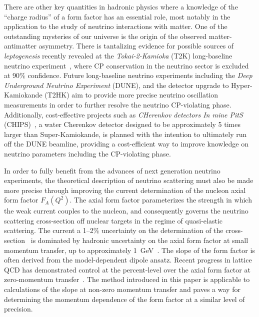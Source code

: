 \documentclass[prd,aps,twocolumn,superscriptaddress,tightenlines,nofootinbib,floatfix,preprintnumbers,10pt]{revtex4-1}
\begin{document}
There are other key quantities in hadronic physics where a knowledge
of the ``charge radius'' of a form factor has an essential role, most
notably in the application to the study of neutrino interactions with
matter.  One of the outstanding mysteries of our universe is the
origin of the observed matter-antimatter asymmetry.  There is
tantalizing evidence for possible sources of \textit{leptogenesis}
recently revealed at the \textit{Tokai-2-Kamioka} (T2K) long-baseline
neutrino experiment~\cite{Abe:2017uxa}, where CP conservation in the
neutrino sector is excluded at 90\% confidence.  Future long-baseline
neutrino experiments including the \textit{Deep Underground Neutrino
  Experiment} (DUNE), and the detector upgrade to Hyper-Kamiokande
(T2HK) aim to provide more precise neutrino oscillation measurements
in order to further resolve the neutrino CP-violating phase.
Additionally, cost-effective projects such as \textit{CHerenkov
  detectors In mine PitS} (CHIPS)~\cite{Adamson:2013xka}, a water
Cherenkov detector designed to be approximately 5 times larger than
Super-Kamiokande, is planned with the intention to ultimately run off
the DUNE beamline, providing a cost-efficient way to improve knowledge
on neutrino parameters including the CP-violating phase.

In order to fully benefit from the advances of next generation neutrino experiments, the theoretical description of neutrino scattering must also be made more precise through improving the current determination of the nucleon axial form factor $F_A(Q^2)$. 
The axial form factor parameterizes the strength in which the weak current couples to the nucleon, and consequently governs the neutrino scattering cross-section off nuclear targets in the regime of quasi-elastic scattering. 
The current a 1--2\% uncertainty on the determination of the cross-section~\cite{Adams:2013qkq} is
dominated by hadronic uncertainty on the axial form factor at small momentum transfer, up to approximately 1~GeV~\cite{Day:2012gb}. 
The slope of the form factor is often derived from the model-dependent dipole ansatz. 
Recent progress in lattice QCD has demonstrated control at the percent-level over the axial form factor at zero-momentum transfer~\cite{Chang:2018uxx}.%
The method introduced in this paper is applicable to calculations of the slope at non-zero momentum transfer and paves a way for determining the momentum dependence of the form factor at a similar level of precision.
\end{document}

